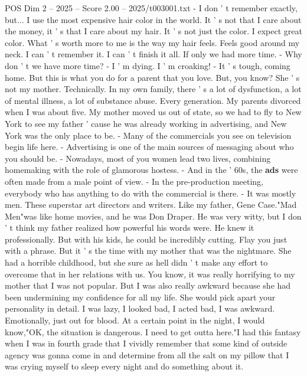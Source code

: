 \begin{textsample}{POS Dim 2 – 2025 – Score 2.00 – 2025/t003001.txt}  \label{ex:f2_pos_096}
- I don ' t remember exactly, but...
I use the most expensive hair color in the world.
It ' s not that I care about the money, it ' s that I care about my hair.
It ' s not just the color.
I expect great color.
What ' s worth more to me is the way my hair feels.
Feels good around my neck.
I can ' t remember it.
I can ' t finish it all.
If only we had more time. - Why don ' t we have more time? - I ' m dying.
I ' m croaking! - It ' s tough, coming home.
But this is what you do for a parent that you love.
But, you know?
She ' s not my mother.
Technically.
In my own family, there ' s a lot of dysfunction, a lot of mental illness, a lot of substance abuse.
Every generation.
My parents divorced when I was about five.
My mother moved us out of state, so we had to fly to New York to see my father ' cause he was already working in advertising, and New York was the only place to be. - Many of the commercials you see on television begin life here. - Advertising is one of the main sources of messaging about who you should be. - Nowadays, most of you women lead two lives, combining homemaking with the role of glamorous hostess. - And in the ' 60s, the \textbf{ads} were often made from a male point of view. - In the pre-production meeting, everybody who has anything to do with the commercial is there. - It was mostly men.
These superstar art directors and writers.
Like my father, Gene Case."Mad Men"was like home movies, and he was Don Draper.
He was very witty, but I don ' t think my father realized how powerful his words were.
He knew it professionally.
But with his kids, he could be incredibly cutting.
Flay you just with a phrase.
But it ' s the time with my mother that was the nightmare.
She had a horrible childhood, but she sure as hell didn ' t make any effort to overcome that in her relations with us.
You know, it was really horrifying to my mother that I was not popular.
But I was also really awkward because she had been undermining my confidence for all my life.
She would pick apart your personality in detail.
I was lazy, I looked bad, I acted bad, I was awkward.
Emotionally, just out for blood.
At a certain point in the night, I would know,"OK, the situation is dangerous.
I need to get outta here."I had this fantasy when I was in fourth grade that I vividly remember that some kind of outside agency was gonna come in and determine from all the salt on my pillow that I was crying myself to sleep every night and do something about it.

\end{textsample}
